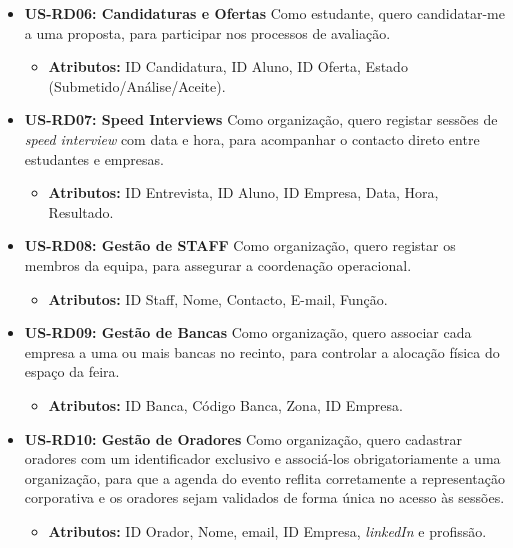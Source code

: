 \documentclass[12pt,a4paper]{article}
\begin{document}
\begin{itemize}[leftmargin=1.5cm]
    \begin{itemize}[leftmargin=1.2cm]
        \item \textbf{Atributos:} ID Inscrição, ID Aluno, ID Palestra, Estado (Confirmado/Lista de Espera).
    \end{itemize}
    \item \textbf{US-RD06: Candidaturas e Ofertas} Como estudante, quero candidatar-me a uma proposta, para participar nos processos de avaliação.
    \begin{itemize}[leftmargin=1.2cm]
        \item \textbf{Atributos:} ID Candidatura, ID Aluno, ID Oferta, Estado (Submetido/Análise/Aceite).
    \end{itemize}
    \item \textbf{US-RD07: Speed Interviews} Como organização, quero registar sessões
    de \textit{speed interview} com data e hora, para acompanhar o contacto
    direto entre estudantes e empresas.
    \begin{itemize}[leftmargin=1.2cm]
        \item \textbf{Atributos:} ID Entrevista, ID Aluno, ID Empresa, Data, Hora, Resultado.
    \end{itemize}
    \item \textbf{US-RD08: Gestão de STAFF} Como organização, quero registar os membros da equipa, para assegurar a coordenação operacional.
    \begin{itemize}[leftmargin=1.2cm]
        \item \textbf{Atributos:} ID Staff, Nome, Contacto, E-mail, Função.
    \end{itemize}
    \item \textbf{US-RD09: Gestão de Bancas} Como organização, quero associar cada
    empresa a uma ou mais bancas no recinto, para controlar a alocação física do espaço
    da feira.
    \begin{itemize}[leftmargin=1.2cm]
        \item \textbf{Atributos:} ID Banca, Código Banca, Zona, ID Empresa.
    \end{itemize}
    \item \textbf{US-RD10: Gestão de Oradores} Como organização,
    quero cadastrar oradores com um identificador exclusivo e associá-los obrigatoriamente a uma organização,
para que a agenda do evento reflita corretamente a representação corporativa e os oradores sejam validados de forma única no acesso às sessões.
    \begin{itemize}[leftmargin=1.2cm]
        \item \textbf{Atributos:} ID Orador, Nome, email, ID Empresa, \textit{linkedIn} e profissão.
    \end{itemize}
\end{itemize}
\end{document}
